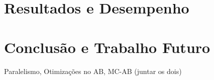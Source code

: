 \documentclass[12pt,a4paper,oneside]{article}
\begin{document}
\lipsum[1]

\lipsum[2]

\lipsum[3]


\section{Resultados e Desempenho}
\label{sec:resdes}

\lipsum[1]

\lipsum[2]

\lipsum[3]


\section{Conclusão e Trabalho Futuro}
\label{sec:conc}

Paralelismo, Otimizações no AB, MC-AB (juntar os dois)

\lipsum[1]

\lipsum[2]



\end{document}
